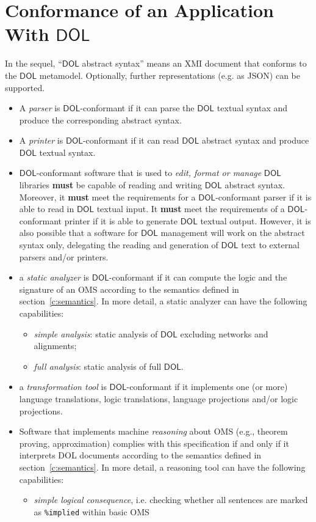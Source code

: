 \documentclass[10pt,fleqn,final]{scrreprt}
\newcommand{\cbs}[0]{\color{red}\xspace} %
\newcommand{\cbe}[0]{\color{black}\xspace} %
\newcommand*{\syntax}[1]{\texttt{#1}}
\newcommand*{\hasto}{\textbf{must}\xspace}
\newcommand*{\DOL}{\ensuremath{\mathsf{DOL}}\xspace}
\newcommand{\sclause}[1]{\section{#1}}
\begin{document}
\sclause{Conformance of an Application With \DOL}\label{c:conform:application}

\cbs
In the sequel, ``\DOL abstract syntax'' means an XMI document that
conforms to the \DOL metamodel. Optionally, further representations
(e.g. as JSON) can be supported.
\begin{itemize}
\item
A \emph{parser} is \DOL-conformant if it can parse the \DOL textual syntax and produce the corresponding abstract syntax.
\item
A \emph{printer} is \DOL-conformant if it can read \DOL abstract syntax and produce \DOL textual syntax.
\item
{\DOL}-conformant software that is used to \emph{edit, format or manage} \DOL libraries \hasto be capable of reading and writing \DOL abstract syntax. Moreover, it \hasto meet the requirements for a \DOL-conformant parser if it is able to read in \DOL textual input. It \hasto meet the requirements of a \DOL-conformant printer if it is able to generate \DOL textual output. However, it is also possible that a software for \DOL management will work on the abstract syntax only,\cbs delegating\cbe the reading and generation of \DOL text to external parsers and/or printers.
\item a \emph{static analyzer} is \DOL-conformant if it can compute
  the logic and the signature of an OMS according to the semantics
  defined in section~\ref{c:semantics}. In more detail, a static analyzer
  can have the following capabilities:
\begin{itemize}
\item \emph{simple analysis}: static analysis of \DOL excluding networks and alignments;
\item \emph{full analysis}: static analysis of full \DOL.
\end{itemize}
\item a \emph{transformation tool} is \DOL-conformant if it implements
one (or more) language translations, logic translations, language
projections and/or logic projections.
\item
Software that implements machine \emph{reasoning} about OMS (e.g., theorem proving, approximation)  complies with this specification if and only if it interprets  DOL documents according to the semantics defined in section~\ref{c:semantics}. In more detail, a reasoning tool can have the following capabilities:
\begin{itemize}
\item \emph{simple logical consequence}, i.e.\cbs checking whether all sentences are\cbe marked as \syntax{\%implied} within basic OMS

\end{itemize}
\end{itemize}
\end{document}
